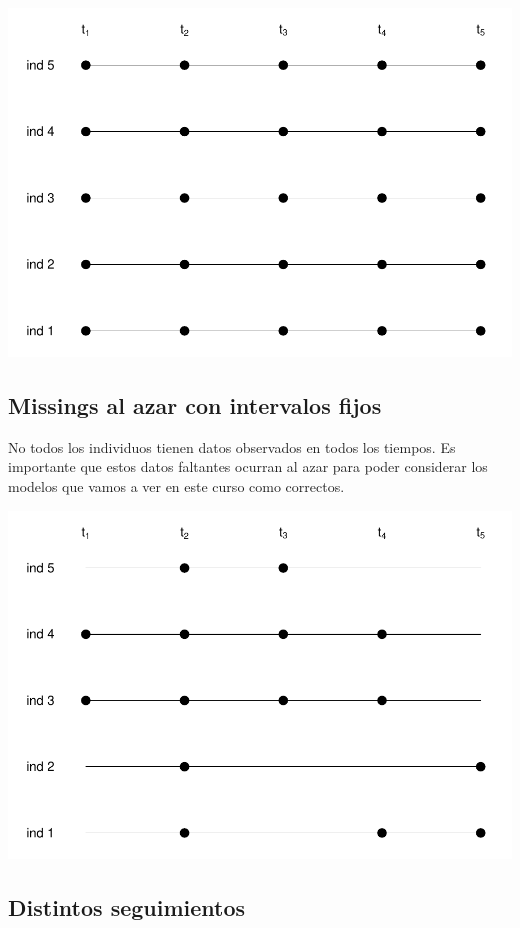 \documentclass[
]{book}
\begin{document}
\includegraphics{fig_out/unnamed-chunk-5-1.pdf}

\hypertarget{missings-al-azar-con-intervalos-fijos}{%
\subsection{Missings al azar con intervalos fijos}\label{missings-al-azar-con-intervalos-fijos}}

No todos los individuos tienen datos observados en todos los tiempos. Es importante que estos datos faltantes ocurran al azar para poder considerar los modelos que vamos a ver en este curso como correctos.

\includegraphics{fig_out/unnamed-chunk-6-1.pdf}

\hypertarget{distintos-seguimientos}{%
\subsection{Distintos seguimientos}\label{distintos-seguimientos}}
\end{document}
